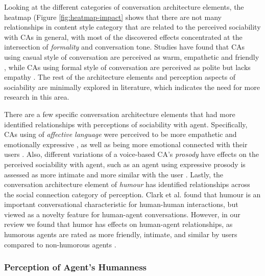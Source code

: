 Looking at the different categories of conversation architecture elements, the heatmap (Figure \ref{fig:heatmap-impact} shows that there are not many relationships in content style category that are related to the perceived sociability with CAs in general, with most of the discovered effects concentrated at the intersection of \textit{formality} and conversation tone. Studies have found that CAs using casual style of conversation are perceived as warm, empathetic and friendly \cite{jestin2022effects}\cmt{[81]}\cite{kim2019comparing}\cmt{[89]}, while CAs using formal style of conversation are perceived as polite but lacks empathy \cite{cox2022does}\cmt{[27]}. The rest of the architecture elements and perception aspects of sociability are minimally explored in literature, which indicates the need for more research in this area.

There are a few specific conversation architecture elements that had more identified relationships with perceptions of sociability with agent. Specifically, CAs using of \textit{affective language} were perceived to be more empathetic \cite{daher2020empathic}\cmt{[58]}\cite{diederich2019emulating}\cmt{[25]}\cite{yang2017perceived}\cmt{[44]} and emotionally expressive \cite{zhu2022effects}\cmt{[26]}, as well as being more emotional connected with their users \cite{lee2019s}\cmt{[55]}\cite{lubis2019positive}\cmt{[43]}. Also, different variations of a voice-based CA's \textit{prosody} have effects on the perceived sociability with agent, such as an agent using expressive prosody is assessed as more intimate and more similar with the user \cite{kim2020can}\cmt{[24]}. Lastly, the conversation architecture element of \textit{humour} has identified relationships across the social connection category of perception. Clark et al. \cite{clark2019makes} found that humour is an important conversational characteristic for human-human interactions, but viewed as a novelty feature for human-agent conversations. However, in our review we found that humor has effects on human-agent relationships, as humorous agents are rated as more friendly, intimate, and similar by users compared to non-humorous agents \cite{go2021conversational}\cmt{[80]}\cite{khooshabeh2011does}\cmt{[37]}. 


\subsubsection{Perception of Agent's Humanness}

